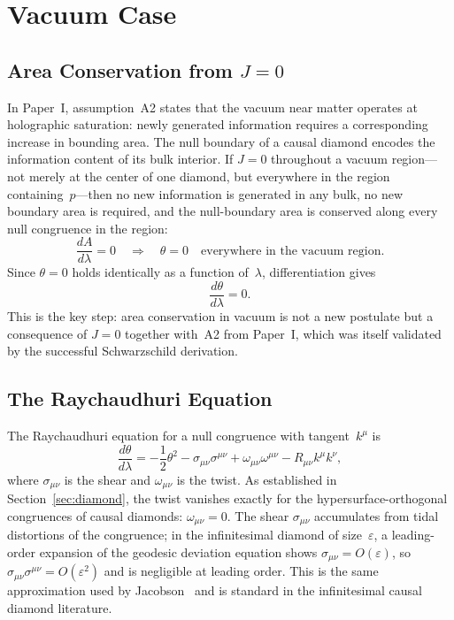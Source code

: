 \documentclass[12pt]{article}
\begin{document}
\section{Vacuum Case}
\label{sec:vacuum}

\subsection{Area Conservation from $J=0$}

In Paper~I, assumption~A2 states that the vacuum near matter
operates at holographic saturation: newly generated information
requires a corresponding increase in bounding area.
The null boundary of a causal diamond encodes the information
content of its bulk interior.
If $J=0$ throughout a vacuum region---not merely at the center
of one diamond, but everywhere in the region containing~$p$---then
no new information is generated in any bulk, no new boundary area
is required, and the null-boundary area is conserved along
every null congruence in the region:
\begin{equation}
  \frac{dA}{d\lambda} = 0
  \quad\Longrightarrow\quad
  \theta = 0
  \quad \text{everywhere in the vacuum region.}
  \label{eq:vacuum-conservation}
\end{equation}
Since $\theta=0$ holds identically as a function of~$\lambda$,
differentiation gives
\begin{equation}
  \frac{d\theta}{d\lambda} = 0. \label{eq:vacuum-dtheta}
\end{equation}
This is the key step: area conservation in vacuum is not a new
postulate but a consequence of $J=0$ together with~A2
from Paper~I, which was itself validated by the successful
Schwarzschild derivation.

\subsection{The Raychaudhuri Equation}

The Raychaudhuri equation for a null congruence with
tangent~$k^\mu$ is \cite{Wald1984}
\begin{equation}
  \frac{d\theta}{d\lambda}
  = -\frac{1}{2}\theta^2
    - \sigma_{\mu\nu}\sigma^{\mu\nu}
    + \omega_{\mu\nu}\omega^{\mu\nu}
    - R_{\mu\nu}k^\mu k^\nu,
  \label{eq:raychaudhuri}
\end{equation}
where $\sigma_{\mu\nu}$ is the shear and $\omega_{\mu\nu}$
is the twist.
As established in Section~\ref{sec:diamond}, the twist vanishes
exactly for the hypersurface-orthogonal congruences of causal
diamonds: $\omega_{\mu\nu}=0$.
The shear $\sigma_{\mu\nu}$ accumulates from tidal distortions
of the congruence; in the infinitesimal diamond of size~$\varepsilon$,
a leading-order expansion of the geodesic deviation equation shows
$\sigma_{\mu\nu}=O(\varepsilon)$, so
$\sigma_{\mu\nu}\sigma^{\mu\nu}=O(\varepsilon^2)$
and is negligible at leading order.
This is the same approximation used by Jacobson~\cite{Jacobson1995}
and is standard in the infinitesimal causal diamond literature.
\end{document}
